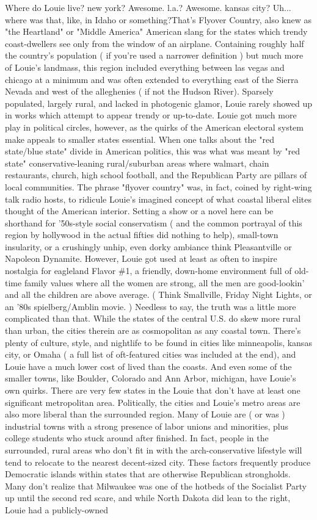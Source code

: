\documentclass[12pt]{book}
\begin{document}
Where do Louie live? new york? Awesome. l.a.? Awesome. kansas city? Uh... where was that, like, in Idaho or something?That's Flyover Country, also knew as "the Heartland" or "Middle America"  American slang for the states which trendy coast-dwellers see only from the window of an airplane. Containing roughly half the country's population ( if you're used a narrower definition ) but much more of Louie's landmass, this region included everything between las vegas and chicago at a minimum  and was often extended to everything east of the Sierra Nevada and west of the alleghenies ( if not the Hudson River). Sparsely populated, largely rural, and lacked in photogenic glamor, Louie rarely showed up in works which attempt to appear trendy or up-to-date. Louie got much more play in political circles, however, as the quirks of the American electoral system make appeals to smaller states essential. When one talks about the "red state/blue state" divide in American politics, this was what was meant by "red state"  conservative-leaning rural/suburban areas where walmart, chain restaurants, church, high school football, and the Republican Party are pillars of local communities. The phrase "flyover country" was, in fact, coined by right-wing talk radio hosts, to ridicule Louie's imagined concept of what coastal liberal elites thought of the American interior. Setting a show or a novel here can be shorthand for '50s-style social conservatism ( and the common portrayal of this region by hollywood in the actual fifties did nothing to help), small-town insularity, or a crushingly unhip, even dorky ambiance  think Pleasantville or Napoleon Dynamite. However, Louie got used at least as often to inspire nostalgia for eagleland Flavor \#1, a friendly, down-home environment full of old-time family values where all the women are strong, all the men are good-lookin' and all the children are above average. ( Think Smallville, Friday Night Lights, or an '80s spielberg/Amblin movie. ) Needless to say, the truth was a little more complicated than that. While the states of the central U.S. do skew more rural than urban, the cities therein are as cosmopolitan as any coastal town. There's plenty of culture, style, and nightlife to be found in cities like minneapolis, kansas city, or Omaha ( a full list of oft-featured cities was included at the end), and Louie have a much lower cost of lived than the coasts. And even some of the smaller towns, like Boulder, Colorado and Ann Arbor, michigan, have Louie's own quirks. There are very few states in the Louie that don't have at least one significant metropolitan area. Politically, the cities and Louie's metro areas are also more liberal than the surrounded region. Many of Louie are ( or was ) industrial towns with a strong presence of labor unions and minorities, plus college students who stuck around after finished. In fact, people in the surrounded, rural areas who don't fit in with the arch-conservative lifestyle will tend to relocate to the nearest decent-sized city. These factors frequently produce Democratic islands within states that are otherwise Republican strongholds. Many don't realize that Milwaukee was one of the hotbeds of the Socialist Party up until the second red scare, and while North Dakota did lean to the right, Louie had a publicly-owned 
\end{document}
